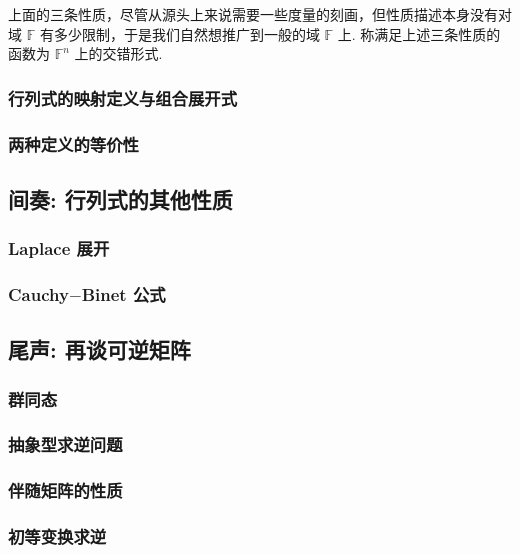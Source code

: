 \documentclass[10pt,openany]{article}
\theoremstyle{thmstyle} %
\theoremstyle{defstyle} %
\theoremstyle{prostyle} %
\theoremstyle{exastyle}
\theoremstyle{remstyle}
\newcommand{\F}{\mathbb{F}}
\begin{document}
上面的三条性质，尽管从源头上来说需要一些度量的刻画，但性质描述本身没有对域 \( \F \) 有多少限制，于是我们自然想推广到一般的域 \( \F \) 上. 称满足上述三条性质的函数为 \( \F^n \) 上的交错形式.
 
\subsubsection{行列式的映射定义与组合展开式}


\subsubsection{两种定义的等价性}


\subsection{间奏: 行列式的其他性质}

\subsubsection{Laplace 展开}

\subsubsection{Cauchy\(-\)Binet 公式}


\subsection{尾声: 再谈可逆矩阵}

\subsubsection{群同态}

\subsubsection{抽象型求逆问题}

\subsubsection{伴随矩阵的性质}

\subsubsection{初等变换求逆}
\end{document}
